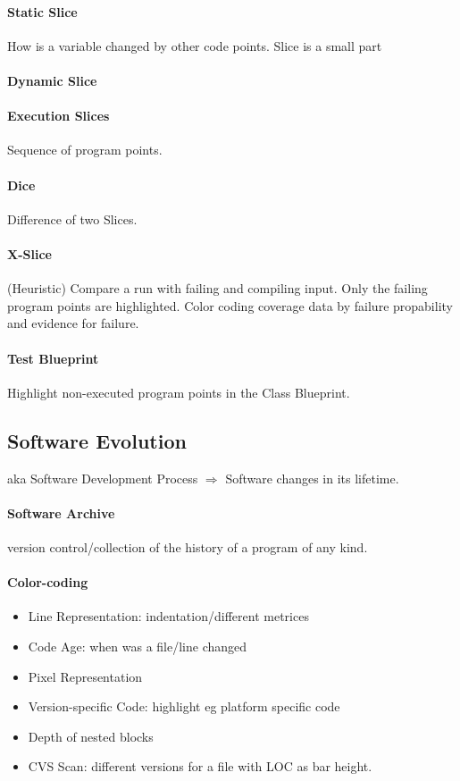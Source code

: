 \documentclass[10pt,a4paper]{article}
\begin{document}
		\paragraph{Static Slice} How is a variable changed by other code points. Slice is a small part
		\paragraph{Dynamic Slice} 
		\paragraph{Execution Slices} Sequence of program points.
		
		\paragraph{Dice} Difference of two Slices.
		
		\paragraph{X-Slice} (Heuristic) Compare a run with failing and compiling input. Only the failing program points are highlighted. Color coding coverage data by failure propability and evidence for failure.
		
		\paragraph{Test Blueprint} Highlight non-executed program points in the Class Blueprint. 
		
	
	\subsection{Software Evolution}
		aka Software Development Process $ \Rightarrow $ Software changes in its lifetime.
		
		\paragraph{Software Archive} version control/collection of the history of a program of any kind. 
		
		\paragraph{Color-coding}
		\begin{itemize}
			\item Line Representation: indentation/different metrices
			\item Code Age: when was a file/line changed
			\item Pixel Representation
			\item Version-specific Code: highlight eg platform specific code
			\item Depth of nested blocks
			\item CVS Scan: different versions for a file with LOC as bar height.
		\end{itemize}
		
\end{document}
